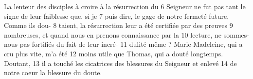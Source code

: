 La lenteur des disciples à croire à la résurrection du	 
6	 	Seigneur ne fut pas tant le signe de leur faiblesse que, si je	 
7	 	puis dire, le gage de notre fermeté future. Comme ils dou-	 
8	 	taient, la résurrection leur a été certifiée par des preuves	 
9	 	nombreuses, et quand nous en prenons connaissance par la	 
10	 	lecture, ne sommes-nous pas fortifiés du fait de leur incré-	 
11	 	dulité même ? Marie-Madeleine, qui a cru plus vite, m'a été	 
12	 	moins utile que Thomas, qui a douté longtemps. Doutant,	 
13	 	il a touché les cicatrices des blessures du Seigneur et enlevé	 
14	 	de notre coeur la blessure du doute.
